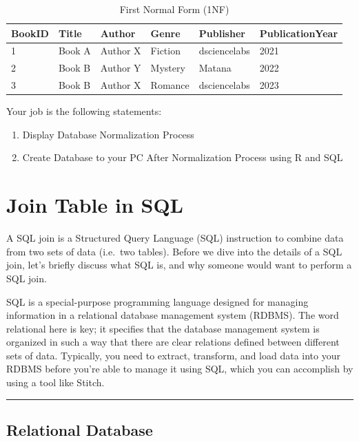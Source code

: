 \documentclass[
]{book}
\providecommand{\tightlist}{%
  \setlength{\itemsep}{0pt}\setlength{\parskip}{0pt}}
\begin{document}
\begin{table}

\caption{\label{tab:unnamed-chunk-57}First Normal Form (1NF)}
\centering
\begin{tabular}[t]{l|l|l|l|l|l}
\hline
BookID & Title & Author & Genre & Publisher & PublicationYear\\
\hline
1 & Book A & Author X & Fiction & dsciencelabs & 2021\\
\hline
2 & Book B & Author Y & Mystery & Matana & 2022\\
\hline
3 & Book B & Author X & Romance & dsciencelabs & 2023\\
\hline
\end{tabular}
\end{table}

Your job is the following statements:

\begin{enumerate}
\def\labelenumi{\arabic{enumi}.}
\tightlist
\item
  Display Database Normalization Process
\item
  Create Database to your PC After Normalization Process using R and SQL
\end{enumerate}

\hypertarget{join-table-in-sql}{%
\chapter{Join Table in SQL}\label{join-table-in-sql}}

A SQL join is a Structured Query Language (SQL) instruction to combine data from two sets of data (i.e.~two tables). Before we dive into the details of a SQL join, let's briefly discuss what SQL is, and why someone would want to perform a SQL join.

SQL is a special-purpose programming language designed for managing information in a relational database management system (RDBMS). The word relational here is key; it specifies that the database management system is organized in such a way that there are clear relations defined between different sets of data. Typically, you need to extract, transform, and load data into your RDBMS before you're able to manage it using SQL, which you can accomplish by using a tool like Stitch.

\begin{center}\rule{0.5\linewidth}{0.5pt}\end{center}

\hypertarget{relational-database}{%
\section{Relational Database}\label{relational-database}}
\end{document}
